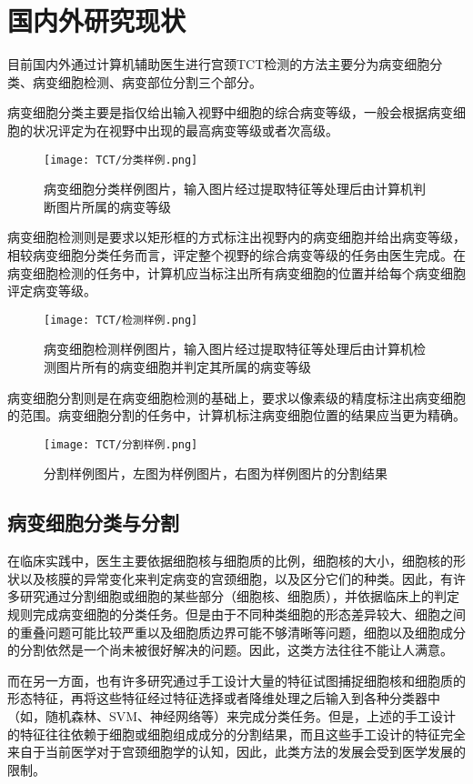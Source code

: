 \cleardoublepage

\section{国内外研究现状}
\par 目前国内外通过计算机辅助医生进行宫颈TCT检测的方法主要分为病变细胞分类、病变细胞检测、病变部位分割三个部分。
\par 病变细胞分类主要是指仅给出输入视野中细胞的综合病变等级，一般会根据病变细胞的状况评定为在视野中出现的最高病变等级或者次高级。

\begin{figure}[h]
    \centering
    \texttt{[image: TCT/分类样例.png]}
    \caption{病变细胞分类样例图片，输入图片经过提取特征等处理后由计算机判断图片所属的病变等级}
    \label{pic:分类样例}
\end{figure}
\par 病变细胞检测则是要求以矩形框的方式标注出视野内的病变细胞并给出病变等级，相较病变细胞分类任务而言，评定整个视野的综合病变等级的任务由医生完成。在病变细胞检测的任务中，计算机应当标注出所有病变细胞的位置并给每个病变细胞评定病变等级。

\begin{figure}[h]
    \centering
    \texttt{[image: TCT/检测样例.png]}
    \caption{病变细胞检测样例图片，输入图片经过提取特征等处理后由计算机检测图片所有的病变细胞并判定其所属的病变等级}
    \label{pic:检测样例}
\end{figure}
\par 病变细胞分割则是在病变细胞检测的基础上，要求以像素级的精度标注出病变细胞的范围。病变细胞分割的任务中，计算机标注病变细胞位置的结果应当更为精确。

\begin{figure}[h]
    \centering
    \texttt{[image: TCT/分割样例.png]}
    \caption{分割样例图片，左图为样例图片，右图为样例图片的分割结果}
    \label{pic:分割样例}
\end{figure}

\subsection{病变细胞分类与分割}
\par 在临床实践中，医生主要依据细胞核与细胞质的比例，细胞核的大小，细胞核的形状以及核膜的异常变化来判定病变的宫颈细胞，以及区分它们的种类。因此，有许多研究\cite{zhang2014segmentation}\cite{zhang2017graph}\cite{lee2016segmentation}通过分割细胞或细胞的某些部分（细胞核、细胞质），并依据临床上的判定规则完成病变细胞的分类任务。但是由于不同种类细胞的形态差异较大、细胞之间的重叠问题可能比较严重以及细胞质边界可能不够清晰等问题，细胞以及细胞成分的分割依然是一个尚未被很好解决的问题。因此，这类方法往往不能让人满意。
\par 而在另一方面，也有许多研究\cite{marinakis2009pap}\cite{phoulady2016automatic}通过手工设计大量的特征试图捕捉细胞核和细胞质的形态特征，再将这些特征经过特征选择或者降维处理之后输入到各种分类器中（如，随机森林、SVM、神经网络等）来完成分类任务。但是，上述的手工设计的特征往往依赖于细胞或细胞组成成分的分割结果，而且这些手工设计的特征完全来自于当前医学对于宫颈细胞学的认知，因此，此类方法的发展会受到医学发展的限制。
